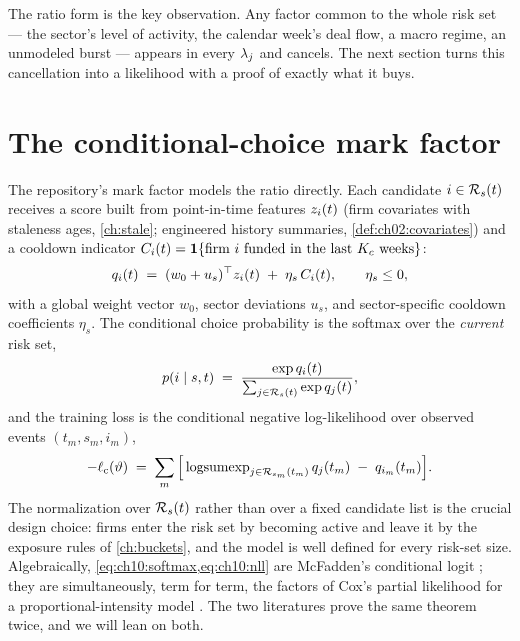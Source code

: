 The ratio form is the key observation. Any factor common to the
whole risk set --- the sector's level of activity, the calendar week's
deal flow, a macro regime, an unmodeled burst --- appears in every
$\lambda_j$ and cancels. The next section turns this cancellation into a
likelihood with a proof of exactly what it buys.

\section{The conditional-choice mark factor}\label{ch10:sec:choice}

The repository's mark factor models the ratio directly. Each candidate
$i \in \mathcal{R}_s(t)$ receives a score built from point-in-time features
$z_i(t)$ (firm covariates with staleness ages, \cref{ch:stale};
engineered history summaries, \cref{def:ch02:covariates}) and a cooldown
indicator $C_i(t) = \mathbf{1}\{\text{firm } i \text{ funded in the last } K_c
\text{ weeks}\}$:
\begin{equation}\label{eq:ch10:score}
q_i(t)
 \;=\;
 (w_0 + u_s)^{\top} z_i(t) \;+\; \eta_s\, C_i(t),
 \qquad \eta_s \le 0,
\end{equation}
with a global weight vector $w_0$, sector deviations $u_s$, and
sector-specific cooldown coefficients $\eta_s$. The conditional choice
probability is the softmax over the \emph{current} risk set,
\begin{equation}\label{eq:ch10:softmax}
p(i \mid s, t)
 \;=\;
 \frac{\exp q_i(t)}{\sum_{j \in \mathcal{R}_s(t)} \exp q_j(t)},
\end{equation}
and the training loss is the conditional negative log-likelihood over
observed events $(t_m, s_m, i_m)$,
\begin{equation}\label{eq:ch10:nll}
-\ell_{\mathrm c}(\vartheta)
 \;=\;
 \sum_{m}
 \Big[
 \operatorname{logsumexp}_{j \in \mathcal{R}_{s_m}(t_m)} q_j(t_m)
 \;-\;
 q_{i_m}(t_m)
 \Big].
\end{equation}
The normalization over $\mathcal{R}_s(t)$ rather than over a fixed candidate
list is the crucial design choice: firms enter the risk set by becoming
active and leave it by the exposure rules of \cref{ch:buckets}, and the
model is well defined for every risk-set size. Algebraically,
\cref{eq:ch10:softmax,eq:ch10:nll} are McFadden's conditional logit
\citep{mcfadden1974,train2009}; they are simultaneously, term for term,
the factors of Cox's partial likelihood for a proportional-intensity
model \citep{cox1972,cox1975}. The two literatures prove the same theorem
twice, and we will lean on both.

